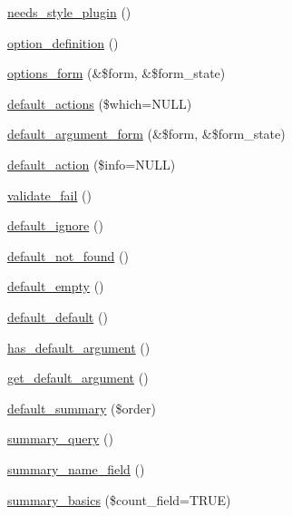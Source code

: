 \begin{CompactItemize}
\item 
\hyperlink{classviews__handler__argument_2c09abe1e98de7438ca0701a14b00861}{needs\_\-style\_\-plugin} ()
\item 
\hyperlink{classviews__handler__argument_117ab20a53624e082e6e32a22d4521cc}{option\_\-definition} ()
\item 
\hyperlink{classviews__handler__argument_44f015a0d527983ae6df2689f66b2c24}{options\_\-form} (\&\$form, \&\$form\_\-state)
\item 
\hyperlink{classviews__handler__argument_bf38ef334b6e18e0aa43e5a829e3ce33}{default\_\-actions} (\$which=NULL)
\item 
\hyperlink{classviews__handler__argument_830cb037bee2daa385618a60d01c0dd1}{default\_\-argument\_\-form} (\&\$form, \&\$form\_\-state)
\item 
\hyperlink{classviews__handler__argument_6c4d14fd0c639184162d7d684a2e04a6}{default\_\-action} (\$info=NULL)
\item 
\hyperlink{classviews__handler__argument_c180c7b4e4f53bdf39272ac17591f13a}{validate\_\-fail} ()
\item 
\hyperlink{classviews__handler__argument_dd70e34213524feae0efaf05235ef60e}{default\_\-ignore} ()
\item 
\hyperlink{classviews__handler__argument_86d899382f0c2cb16177d18b553827af}{default\_\-not\_\-found} ()
\item 
\hyperlink{classviews__handler__argument_0648192a05a597bd19ff2ba6e5bdaa91}{default\_\-empty} ()
\item 
\hyperlink{classviews__handler__argument_15f51f60c6183e6975d0aef857ad7f42}{default\_\-default} ()
\item 
\hyperlink{classviews__handler__argument_bfc79c3b710372accd054b73bbb7b373}{has\_\-default\_\-argument} ()
\item 
\hyperlink{classviews__handler__argument_4362d110d5cb6c7aa46770974289dbaf}{get\_\-default\_\-argument} ()
\item 
\hyperlink{classviews__handler__argument_c74b6bb7bc136e4ac0883849dd532f73}{default\_\-summary} (\$order)
\item 
\hyperlink{classviews__handler__argument_1dd6cc301b1c7c1c6829c59eb641a883}{summary\_\-query} ()
\item 
\hyperlink{classviews__handler__argument_6432caaadc9ed6e918ae8018bbb03ae2}{summary\_\-name\_\-field} ()
\item 
\hyperlink{classviews__handler__argument_a5fe1eefd53a7ee6438b34c8cdbb1aec}{summary\_\-basics} (\$count\_\-field=TRUE)

\end{CompactItemize}
